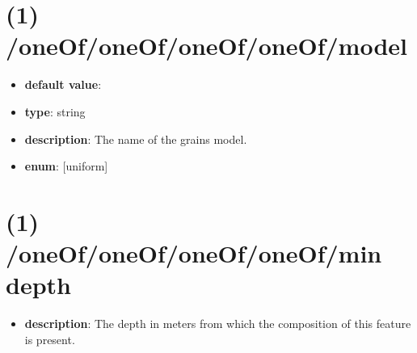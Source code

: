 \section{(1) /oneOf/oneOf/oneOf/oneOf/model}
\begin{itemize}[leftmargin=1em]\item {\bf default value}: 
\item {\bf type}: string
\item {\bf description}: The name of the grains model.
\item {\bf enum}: [uniform]\end{itemize}\section{(1) /oneOf/oneOf/oneOf/oneOf/min depth}
\begin{itemize}[leftmargin=1em]\item {\bf description}: The depth in meters from which the composition of this feature is present.
\end{itemize}
